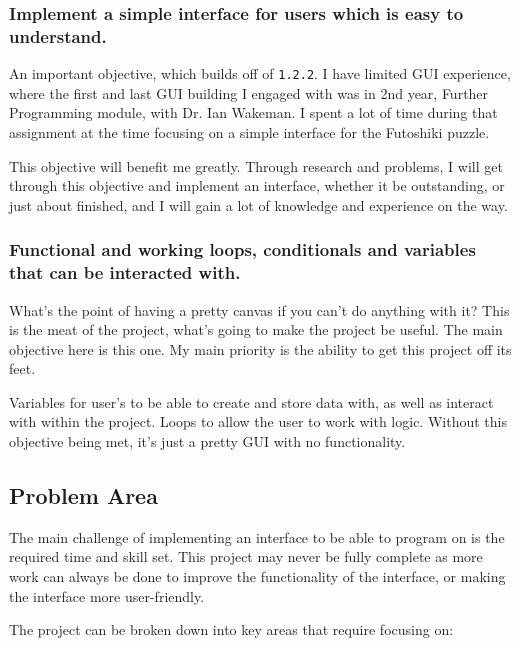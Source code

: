 \documentclass[a4paper, 12pt]{article}
\begin{document}
            \subsubsection{Implement a simple interface for users which is easy to
            understand.}
                An important objective, which builds off of \texttt{1.2.2}. I have limited GUI
                experience, where the first and last GUI building I engaged with was in 2nd year,
                Further Programming module, with Dr. Ian Wakeman. I spent a lot of time during that
                assignment at the time focusing on a simple interface for the Futoshiki puzzle.

                This objective will benefit me greatly. Through research and problems, I will
                get through this objective and implement an interface, whether it be outstanding,
                or just about finished, and I will gain a lot of knowledge and experience on
                the way.

            \subsubsection{Functional and working loops, conditionals and
            variables that can be interacted with.}
                What's the point of having a pretty canvas if you can't do anything with it?
                This is the meat of the project, what's going to make the project be useful.
                The main objective here is this one. My main priority is the ability to get
                this project off its feet.

                Variables for user's to be able to create and store data with, as well as
                interact with within the project. Loops to allow the user to work with logic.
                Without this objective being met, it's just a pretty GUI with no functionality.

        \subsection{Problem Area}
            The main challenge of implementing an interface to be able to program on is the required 
            time and skill set. This project may never be fully complete as more work can always be 
            done to improve the functionality of the interface, or making the interface more user-friendly.

            The project can be broken down into key areas that require focusing on:
        
\end{document}
